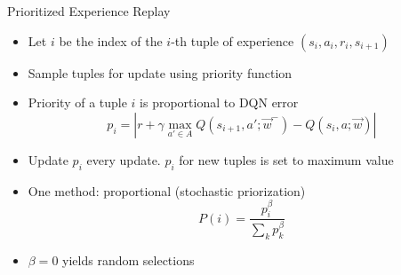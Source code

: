 \begin{frame}[c]{Prioritized Experience Replay }
	
	
	\begin{itemize}
		\item Let $i$ be the index of the $i$-th tuple of experience $(s_i,a_i,r_i,s_{i+1})$
		\item Sample tuples for update using priority function
		\item Priority of a tuple $i$ is proportional to DQN error
		$$ p_i = | r + \gamma \max_{a' \in A} Q(s_{i+1}, a'; \vec{w}^-) - Q(s_i,a;\vec{w}) |$$
		\item Update $p_i$ every update. $p_i$ for new tuples is set to maximum value
		\item One method: proportional (stochastic priorization)
		$$ P(i) = \frac{p_i^\beta}{\sum_k p_k^\beta}$$
		\item $\beta = 0$ yields random selections 
	\end{itemize}
	
\end{frame}

